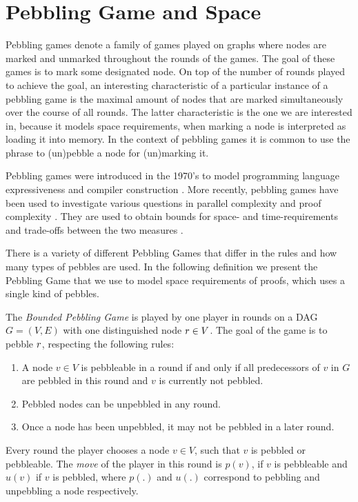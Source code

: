 \section{Pebbling Game and Space}
\label{sec:pebbling-game}

Pebbling games denote a family of games played on graphs where nodes are marked and unmarked throughout the rounds of the games.
The goal of these games is to mark some designated node.
On top of the number of rounds played to achieve the goal, an interesting characteristic of a particular instance of a pebbling game is the maximal amount of nodes that are marked simultaneously over the course of all rounds.
The latter characteristic is the one we are interested in, because it models space requirements, when marking a node is interpreted as loading it into memory.
In the context of pebbling games it is common to use the phrase to (un)pebble a node for (un)marking it.

Pebbling games were introduced in the 1970's to model programming language expressiveness \cite{Pippenger1980,Walker1973} and compiler construction \cite{Sethi1975}. 
More recently, pebbling games have been used to investigate various questions in parallel complexity \cite{Chan2013} and proof complexity \cite{Ben-Sasson2009,Esteban2001,Nordstroem2009}. 
They are used to obtain bounds for space- and time-requirements and trade-offs between the two measures \cite{EmdeBoas1979,Ben-Sasson2002}.

There is a variety of different Pebbling Games that differ in the rules and how many types of pebbles are used.
In the following definition we present the Pebbling Game that we use to model space requirements of proofs, which uses a single kind of pebbles.

\begin{definition}
\label{def:pebbling-game}

The \emph{Bounded Pebbling Game} is played by one player in rounds on a DAG $G = (V,E)$ with one distinguished node $r \in V$.
The goal of the game is to pebble $r$, respecting the following rules:
\begin{enumerate}
	\item \label{rule:premises} A node $v \in V$ is pebbleable in a round if and only if all predecessors of $v$ in $G$ are pebbled in this round and $v$ is currently not pebbled.
	\item \label{rule:unpebbling} Pebbled nodes can be unpebbled in any round.
	\item \label{rule:onlyonce} Once a node has been unpebbled, it may not be pebbled in a later round.
\end{enumerate}
Every round the player chooses a node $v \in V$, such that $v$ is pebbled or pebbleable.
The \emph{move} of the player in this round is $p(v)$, if $v$ is pebbleable and $u(v)$ if $v$ is pebbled, where $p(.)$ and $u(.)$ correspond to pebbling and unpebbling a node respectively.

\end{definition}

